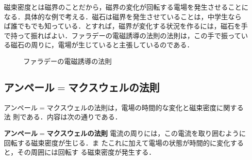         磁束密度とは磁界のことだから，磁界の変化が回転する電場を発生させることに
        なる．具体的な例で考える．磁石は磁界を発生させていることは，中学生なら
        ば誰でもでも知っている．とすれば，磁界が変化する状況を作るには，磁石を手
        で持って振ればよい．ファラデーの電磁誘導の法則の法則は，この手で振ってい
        る磁石の周りに，電場が生じていると主張しているのである．
                \begin{figure}[hbt]
                    \begin{center}
                        \caption{ファラデーの電磁誘導の法則}
                        \label{fig:FaradayLowImage_01}
                    \end{center}
                \end{figure}


        \subsection{アンペール$=$マクスウェルの法則}
        アンペール$=$マクスウェルの法則は，電場の時間的な変化と磁束密度に関する法
        則である．内容は次の通りである．
            \\
            \begin{itembox}[l]{\textbf{アンペール$=$マクスウェルの法則}}
                電流の周りには，この電流を取り囲むように回転する磁束密度が生じる．ま
                たこれに加えて電場の状態が時間的に変化すると，その周囲には回転す
                る磁束密度が発生する．
            \end{itembox}
            \\

